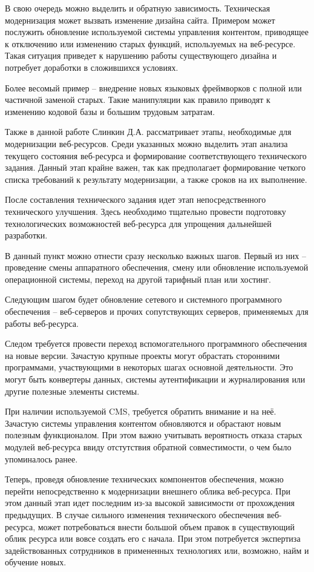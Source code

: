 В свою очередь можно выделить и обратную зависимость.
Техническая модернизация может вызвать изменение дизайна сайта.
Примером может послужить обновление используемой системы управления контентом, приводящее к отключению или изменению старых функций, используемых на веб-ресурсе.
Такая ситуация приведет к нарушению работы существующего дизайна и потребует доработки в сложившихся условиях.

Более весомый пример -- внедрение новых языковых фреймворков с полной или частичной заменой старых.
Такие манипуляции как правило приводят к изменению кодовой базы и большим трудовым затратам. 

Также в данной работе \cite{slinkin-sovremennie} Слинкин Д.А. рассматривает этапы, необходимые для модернизации веб-ресурсов.
Среди указанных можно выделить этап анализа текущего состояния веб-ресурса и формирование соответствующего технического задания.
Данный этап крайне важен, так как предполагает формирование четкого списка требований к результату модернизации, а также сроков на их выполнение.

После составления технического задания идет этап непосредственного технического улучшения.
Здесь необходимо тщательно провести подготовку технологических возможностей веб-ресурса для упрощения дальнейшей разработки.

В данный пункт можно отнести сразу несколько важных шагов.
Первый из них -- проведение смены аппаратного обеспечения, смену или обновление используемой операционной системы, переход на другой тарифный план или хостинг.

Следующим шагом будет обновление сетевого и системного программного обеспечения -- веб-серверов и прочих сопутствующих серверов, применяемых для работы веб-ресурса.

Следом требуется провести переход вспомогательного программного обеспечения на новые версии.
Зачастую крупные проекты могут обрастать сторонними программами, участвующими в некоторых шагах основной деятельности.
Это могут быть конвертеры данных, системы аутентификации и журналирования или другие полезные элементы системы.

При наличии используемой CMS, требуется обратить внимание и на неё.
Зачастую системы управления контентом обновляются и обрастают новым полезным функционалом.
При этом важно учитывать вероятность отказа старых модулей веб-ресурса ввиду отстутствия обратной совместимости, о чем было упоминалось ранее.

Теперь, проведя обновление технических компонентов обеспечения, можно перейти непосредственно к модернизации внешнего облика веб-ресурса.
При этом данный этап идет последним из-за высокой зависимости от прохождения предыдущих.
В случае сильного изменения технического обеспечения веб-ресурса, может потребоваться внести большой объем правок в существующий облик ресурса или вовсе создать его с начала.
При этом потребуется экспертиза задействованных сотрудников в примененных технологиях или, возможно, найм и обучение новых.

